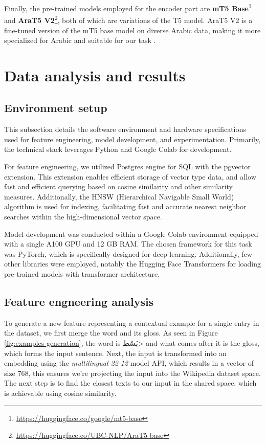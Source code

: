 \documentclass[12pt]{article}
\begin{document}
Finally, the pre-trained models employed for the encoder part are \textbf{mT5 Base}\footnote{\href{https://huggingface.co/google/mt5-base}{https://huggingface.co/google/mt5-base}} and \textbf{AraT5 V2}\footnote{\href{https://huggingface.co/UBC-NLP/AraT5-base}{https://huggingface.co/UBC-NLP/AraT5-base}}, both of which are variations of the T5 model. AraT5 V2 is a fine-tuned version of the mT5 base model on diverse Arabic data, making it more specialized for Arabic and suitable for our task \cite{Nagoudi2021}.

\newpage

\section{Data analysis and results}

\subsection{Environment setup}

This subsection details the software environment and hardware specifications used for feature engineering, model development, and experimentation. Primarily, the technical stack leverages Python and Google Colab for development.

For feature engineering, we utilized Postgres engine for SQL with the pgvector extension. This extension enables efficient storage of vector type data, and allow fast and efficient querying based on cosine similarity and other similarity measures. Additionally, the HNSW (Hierarchical Navigable Small World) algorithm is used for indexing, facilitating fast and accurate nearest neighbor searches within the high-dimensional vector space.

Model development was conducted within a Google Colab environment equipped with a single A100 GPU and 12 GB RAM. The chosen framework for this task was PyTorch, which is specifically designed for deep learning. Additionally, few other libraries were employed, notably the Hugging Face Transformers for loading pre-trained models with transformer architecture.

\subsection{Feature engneering analysis}

To generate a new feature representing a contextual example for a single entry in the dataset, we first merge the word and its gloss. As seen in Figure \ref{fig:examples-generation}, the word is \<بَسْط> and what comes after it is the gloss, which forms the input sentence. Next, the input is transformed into an embedding using the \textit{multilingual-22-12} model API, which results in a vector of size 768, this ensures we’re projecting the input into the Wikipedia dataset space. The next step is to find the closest texts to our input in the shared space, which is achievable using cosine similarity.
\end{document}
